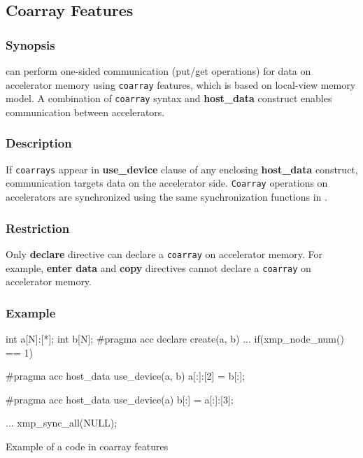 \subsection{Coarray Features} \label{sec:coarray}
\subsubsection*{Synopsis}
{\XACC} can perform one-sided communication (put/get operations) for data on accelerator memory using {\tt coarray} features,
which is based on {\XMP} local-view memory model.
A combination of {\tt coarray} syntax and {\OACC} {\bf host\_data} construct enables communication between accelerators.

\subsubsection*{Description}
If {\tt coarrays} appear in {\OACC} {\bf use\_device} clause of any {\OACC} enclosing {\bf host\_data} construct, 
communication targets data on the accelerator side. 
{\tt Coarray} operations on accelerators are synchronized using the same synchronization functions in {\XMP}.

\subsubsection*{Restriction}
Only {\OACC} {\bf declare} directive can declare a {\tt coarray} on accelerator memory.
For example,
{\OACC} {\bf enter data} and {\bf copy} directives cannot declare a {\tt coarray} on accelerator memory.

\subsubsection*{Example}
\begin{myfigure}
\begin{minipage}{0.45\hsize}
\begin{center}
\end{center}
\end{minipage}
%
\begin{minipage}{0.53\hsize}
\begin{center}
\begin{XACCCexampleR}
int a[N]:[*];
int b[N];
#pragma acc declare create(a, b)
...
if(xmp_node_num() == 1){
#pragma acc host_data use_device(a, b)
  a[:]:[2] = b[:];

#pragma acc host_data use_device(a)
  b[:] = a[:]:[3];
}
...
xmp_sync_all(NULL);
\end{XACCCexampleR}
\end{center}
\end{minipage}
\caption{Example of a code in {\XACC} coarray features}\label{code:coarray}
\end{myfigure}

